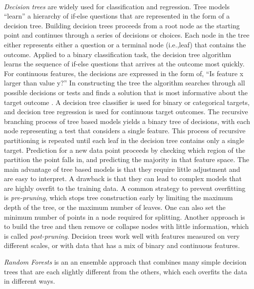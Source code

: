 \\\documentclass[sigconf]{acmart}
\begin{document}
\emph{Decision trees} are widely used for classification and regression. 
Tree models ``learn'' a hierarchy of if-else questions that are represented 
in the form of a decision tree. Building decision trees proceeds from a root 
node as the starting point and continues through a series of decisions or 
choices. Each node in the tree either represents either a question or a 
terminal node (i.e.,leaf) that contains the outcome. Applied to a binary 
classification task, the decision tree algorithm learns the sequence of 
if-else questions that arrives at the outcome most quickly. For continuous 
features, the decisions are expressed in the form of, ``Is feature x larger 
than value y?'' In constructing the tree the algorithm searches through all
possible decisions or tests and finds a solution that is most informative 
about the target outcome \cite{muller17}. A decision tree classifier is used 
for binary or categorical targets, and decision tree regression is used for 
continuous target outcomes. The recursive branching process of tree based 
models yields a binary tree of decisions, with each node representing a test 
that considers a single feature. This process of recursive partitioning is 
repeated until each leaf in the decision tree contains only a single target. 
Prediction for a new data point proceeds by checking which region of the 
partition the point falls in, and predicting the majority in that feature space. 
The main advantage of tree based models is that they require little adjustment 
and are easy to interpret. A drawback is that they can lead to complex models 
that are highly overfit to the training data. A common strategy to prevent 
overfitting is \emph{pre-pruning}, which stops tree construction early by 
limiting the maximum depth of the tree, or the maximum number of leaves. 
One can also set the minimum number of points in a node required for splitting. 
Another approach is to build the tree and then remove or collapse nodes with 
little information, which is called \emph{post-pruning}. Decision trees work 
well with features measured on very different scales, or with data that has 
a mix of binary and continuous features. 


\emph{Random Forests} is an an ensemble approach that combines many simple
decision trees that are each slightly different from the others, which each overfits the data in different ways. 
\end{document}
